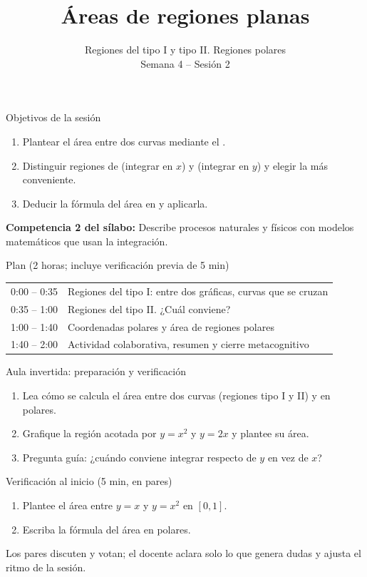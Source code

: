 \documentclass[10pt,aspectratio=169]{beamer}
\title[Áreas de regiones planas]{Áreas de regiones planas}
\subtitle{Regiones del tipo I y tipo II. Regiones polares\\[2pt]\small Semana 4 -- Sesión 2}
\begin{document}
\begin{frame}
  \titlepage
\end{frame}

\begin{frame}{Objetivos de la sesión}
  \begin{enumerate}
    \item Plantear el área entre dos curvas mediante el .
    \item Distinguir regiones de  (integrar en $x$) y  (integrar en $y$) y elegir la más conveniente.
    \item Deducir la fórmula del área en  y aplicarla.
  \end{enumerate}
  \vspace{1mm}
  {\small\textbf{Competencia 2 del sílabo:} Describe procesos naturales y físicos con modelos matemáticos que usan la integración.}
  \begin{block}{Plan (2 horas; incluye verificación previa de 5 min)}
    \begin{tabular}{ll}
      0:00 -- 0:35 & Regiones del tipo I: entre dos gráficas, curvas que se cruzan\\
      0:35 -- 1:00 & Regiones del tipo II. ¿Cuál conviene?\\
      1:00 -- 1:40 & Coordenadas polares y área de regiones polares\\
      1:40 -- 2:00 & Actividad colaborativa, resumen y cierre metacognitivo
    \end{tabular}
  \end{block}
\end{frame}

\begin{frame}{Aula invertida: preparación y verificación}
  \small
  \begin{previa}
    \begin{enumerate}
      \item Lea cómo se calcula el área entre dos curvas (regiones tipo I y II) y en polares.
      \item Grafique la región acotada por $y=x^2$ y $y=2x$ y plantee su área.
      \item Pregunta guía: ¿cuándo conviene integrar respecto de $y$ en vez de $x$?
    \end{enumerate}
  \end{previa}
  \begin{block}{Verificación al inicio (5 min, en pares)}
    \begin{enumerate}
      \item Plantee el área entre $y=x$ y $y=x^2$ en $[0,1]$.
      \item Escriba la fórmula del área en polares.
    \end{enumerate}
    Los pares discuten y votan; el docente aclara solo lo que genera dudas y ajusta el ritmo de la sesión.
  \end{block}
\end{frame}
\end{document}
